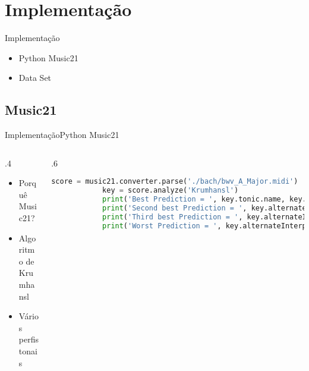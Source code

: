\section{Implementação}
\begin{frame}{Implementação}{}
\begin{itemize}
  \item Python Music21
  \item Data Set
\end{itemize}

\end{frame}

\subsection{Music21}
\begin{frame}[fragile]{Implementação}{Python Music21}
    \begin{columns}[]
      \begin{column}{.4\textwidth}
        \begin{itemize}
          \item Porquê Music21?
          \item Algoritmo de Krumhansl
          \item Vários perfis tonais
        \end{itemize}
    \end{column}
    \begin{column}{.6\textwidth}
        \begin{lstlisting}[language=Python, linewidth=0.90\linewidth,basicstyle=\tiny]
            score = music21.converter.parse('./bach/bwv_A_Major.midi')
            key = score.analyze('Krumhansl')
            print('Best Prediction = ', key.tonic.name, key.mode, key.correlationCoefficient)
            print('Second best Prediction = ', key.alternateInterpretations[0].tonic.name, key.alternateInterpretations[0].mode, key.alternateInterpretations[0].correlationCoefficient)
            print('Third best Prediction = ', key.alternateInterpretations[1].tonic.name, key.alternateInterpretations[1].mode, key.alternateInterpretations[1].correlationCoefficient)
            print('Worst Prediction = ', key.alternateInterpretations[22].tonic.name, key.alternateInterpretations[22].mode, key.alternateInterpretations[22].correlationCoefficient)
        \end{lstlisting}
    \end{column}
  \end{columns}
\end{frame}

